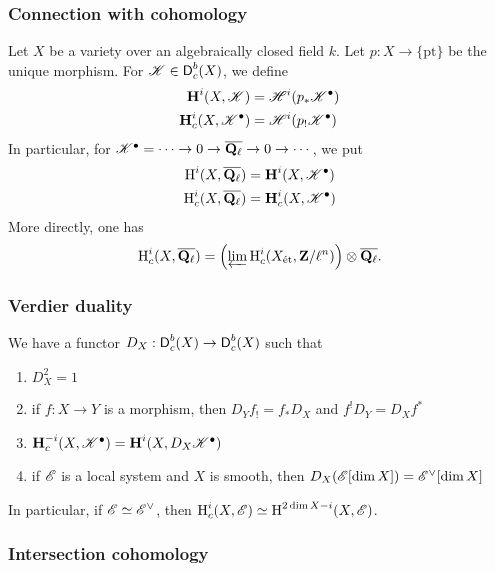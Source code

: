 \subsubsection{Connection with cohomology}

Let $X$ be a variety over an algebraically closed field $k$. Let 
$p:X\to \{\mathrm{pt}\}$ be the unique morphism. For $\mathscr{K}\in \operatorname{\mathsf{D}}_c^b(X)$, 
we define 
\begin{align*}
  \operatorname{\mathbf{H}}^i(X,\mathscr{K}) &= \mathscr{H}^i(p_\ast \mathscr{K}^\bullet) \\
  \operatorname{\mathbf{H}}_c^i(X,\mathscr{K}^\bullet) &= \mathscr{H}^i(p_! \mathscr{K}^\bullet) 
\end{align*}
In particular, for $\mathscr{K}^\bullet = \cdots \to 0 \to \overline{\mathbf{Q}_\ell} \to 0 \to \cdots$, 
we put 
\begin{align*}
  \operatorname{H}^i(X,\overline{\mathbf{Q}_\ell}) &= \operatorname{\mathbf{H}}^i(X,\mathscr{K}^\bullet) \\
  \operatorname{H}_c^i(X,\overline{\mathbf{Q}_\ell}) &= \operatorname{\mathbf{H}}_c^i(X,\mathscr{K}^\bullet) 
\end{align*}
More directly, one has 
\[
  \operatorname{H}_c^i(X,\overline{\mathbf{Q}_\ell}) = \left(\varprojlim \operatorname{H}_c^i(X_{\textnormal{\'et}},\mathbf{Z}/\ell^n)\right)\otimes \overline{\mathbf{Q}_\ell} .
\]


\subsubsection{Verdier duality}

We have a functor $D_X:\operatorname{\mathsf{D}}_c^b(X) \to \operatorname{\mathsf{D}}_c^b(X)$ such that 
\begin{enumerate}
  \item $D_X^2=1$
  \item if $f:X\to Y$ is a morphism, then $D_Y f_! = f_\ast D_X$ and $f^! D_Y = D_X f^\ast$ 
  \item $\operatorname{\mathbf{H}}_c^{-i}(X,\mathscr{K}^\bullet) = \operatorname{\mathbf{H}}^i(X,D_X \mathscr{K}^\bullet)$
  \item if $\mathscr{E}$ is a local system and $X$ is smooth, then 
    $D_X(\mathscr{E}[\dim X]) = \mathscr{E}^\vee[\dim X]$
\end{enumerate}
In particular, if $\mathscr{E}\simeq \mathscr{E}^\vee$, then 
$\operatorname{H}_c^i(X,\mathscr{E}) \simeq \operatorname{H}^{2\dim X-i}(X,\mathscr{E})$. 


\subsubsection{Intersection cohomology}

